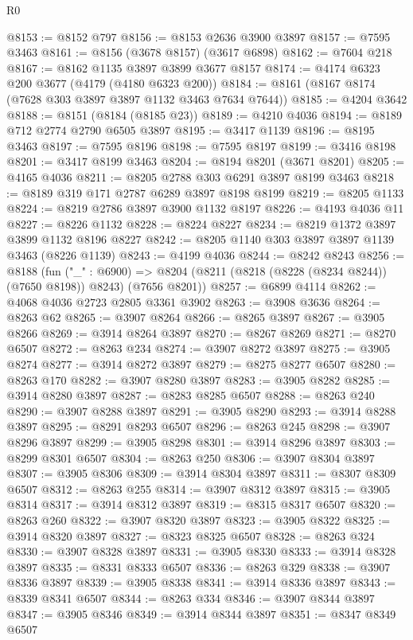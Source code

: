 \begin{lexlean}{R0}
\begin{coremodule}
@8153 := @8152 @797
@8156 := @8153 @2636 @3900 @3897
@8157 := @7595 @3463
@8161 := @8156 (@3678 @8157) (@3617 @6898)
@8162 := @7604 @218
@8167 := @8162 @1135 @3897 @3899 @3677 @8157
@8174 := @4174 @6323 @200 @3677 (@4179 (@4180 @6323 @200))
@8184 := @8161 (@8167 @8174 (@7628 @303 @3897 @3897 @1132 @3463 @7634 @7644))
@8185 := @4204 @3642
@8188 := @8151 (@8184 (@8185 @23))
@8189 := @4210 @4036
@8194 := @8189 @712 @2774 @2790 @6505 @3897
@8195 := @3417 @1139
@8196 := @8195 @3463
@8197 := @7595 @8196
@8198 := @7595 @8197
@8199 := @3416 @8198
@8201 := @3417 @8199 @3463
@8204 := @8194 @8201 (@3671 @8201)
@8205 := @4165 @4036
@8211 := @8205 @2788 @303 @6291 @3897 @8199 @3463
@8218 := @8189 @319 @171 @2787 @6289 @3897 @8198 @8199
@8219 := @8205 @1133
@8224 := @8219 @2786 @3897 @3900 @1132 @8197
@8226 := @4193 @4036 @11
@8227 := @8226 @1132
@8228 := @8224 @8227
@8234 := @8219 @1372 @3897 @3899 @1132 @8196 @8227
@8242 := @8205 @1140 @303 @3897 @3897 @1139 @3463 (@8226 @1139)
@8243 := @4199 @4036
@8244 := @8242 @8243
@8256 := @8188
    (fun ("_" : @6900) =>
    @8204 (@8211 (@8218 (@8228 (@8234 @8244)) (@7650 @8198)) @8243) (@7656 @8201))
@8257 := @6899 @4114
@8262 := @4068 @4036 @2723 @2805 @3361 @3902
@8263 := @3908 @3636
@8264 := @8263 @62
@8265 := @3907 @8264
@8266 := @8265 @3897
@8267 := @3905 @8266
@8269 := @3914 @8264 @3897
@8270 := @8267 @8269
@8271 := @8270 @6507
@8272 := @8263 @234
@8274 := @3907 @8272 @3897
@8275 := @3905 @8274
@8277 := @3914 @8272 @3897
@8279 := @8275 @8277 @6507
@8280 := @8263 @170
@8282 := @3907 @8280 @3897
@8283 := @3905 @8282
@8285 := @3914 @8280 @3897
@8287 := @8283 @8285 @6507
@8288 := @8263 @240
@8290 := @3907 @8288 @3897
@8291 := @3905 @8290
@8293 := @3914 @8288 @3897
@8295 := @8291 @8293 @6507
@8296 := @8263 @245
@8298 := @3907 @8296 @3897
@8299 := @3905 @8298
@8301 := @3914 @8296 @3897
@8303 := @8299 @8301 @6507
@8304 := @8263 @250
@8306 := @3907 @8304 @3897
@8307 := @3905 @8306
@8309 := @3914 @8304 @3897
@8311 := @8307 @8309 @6507
@8312 := @8263 @255
@8314 := @3907 @8312 @3897
@8315 := @3905 @8314
@8317 := @3914 @8312 @3897
@8319 := @8315 @8317 @6507
@8320 := @8263 @260
@8322 := @3907 @8320 @3897
@8323 := @3905 @8322
@8325 := @3914 @8320 @3897
@8327 := @8323 @8325 @6507
@8328 := @8263 @324
@8330 := @3907 @8328 @3897
@8331 := @3905 @8330
@8333 := @3914 @8328 @3897
@8335 := @8331 @8333 @6507
@8336 := @8263 @329
@8338 := @3907 @8336 @3897
@8339 := @3905 @8338
@8341 := @3914 @8336 @3897
@8343 := @8339 @8341 @6507
@8344 := @8263 @334
@8346 := @3907 @8344 @3897
@8347 := @3905 @8346
@8349 := @3914 @8344 @3897
@8351 := @8347 @8349 @6507

\end{coremodule}
\end{lexlean}
